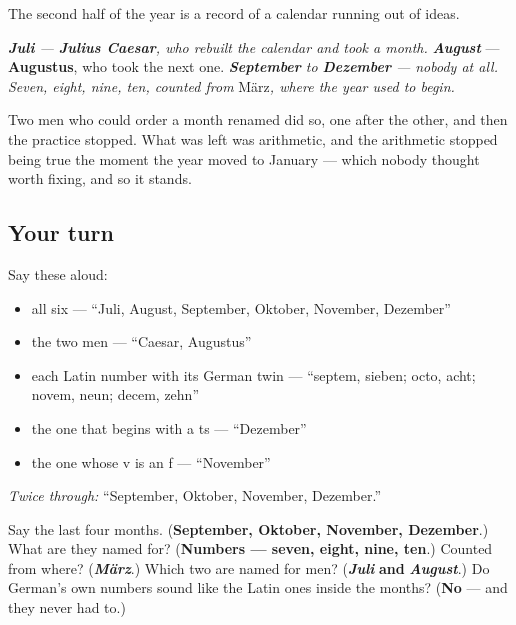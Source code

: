 \begin{culture}
The second half of the year is a record of a calendar running out of ideas.

\emph{ \emph{\textbf{Juli}} — \textbf{Julius Caesar}, who rebuilt the calendar and took a month. } \emph{\textbf{August}} — \textbf{Augustus}, who took the next one. \emph{ \emph{\textbf{September}} to \emph{\textbf{Dezember}} — nobody at all. Seven, eight, nine, ten, counted from }März\emph{, where the year used to begin.}

Two men who could order a month renamed did so, one after the other, and then the practice stopped. What was left was arithmetic, and the arithmetic stopped being true the moment the year moved to January — which nobody thought worth fixing, and so it stands.
\end{culture}

\subsection*{Your turn}
Say these aloud:

\begin{itemize}
\raggedright
  \item all six — \textquotedblleft{}Juli, August, September, Oktober, November, Dezember\textquotedblright{}
  \item the two men — \textquotedblleft{}Caesar, Augustus\textquotedblright{}
  \item each Latin number with its German twin — \textquotedblleft{}septem, sieben; octo, acht; novem, neun; decem, zehn\textquotedblright{}
  \item the one that begins with a ts — \textquotedblleft{}Dezember\textquotedblright{}
  \item the one whose v is an f — \textquotedblleft{}November\textquotedblright{}
\end{itemize}

\emph{Twice through:} \textquotedblleft{}September, Oktober, November, Dezember.\textquotedblright{}

\begin{tcolorbox}[breakable,colback=teal!4,colframe=teal!35!black,title={Before you move on}]
Say the last four months. (\textbf{September, Oktober, November, Dezember}.) What are they named for? (\textbf{Numbers — seven, eight, nine, ten}.) Counted from where? (\emph{\textbf{März}}.) Which two are named for men? (\emph{\textbf{Juli}} \textbf{and} \emph{\textbf{August}}.) Do German's own numbers sound like the Latin ones inside the months? (\textbf{No} — and they never had to.)
\end{tcolorbox}
